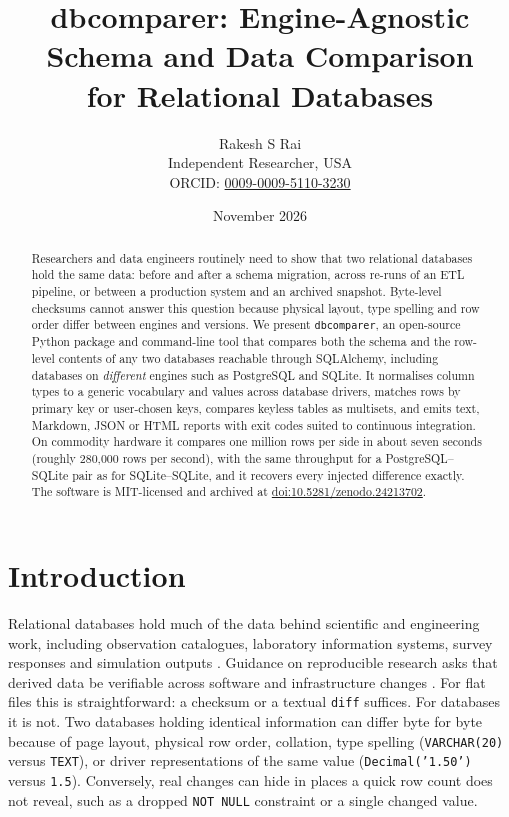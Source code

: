 \documentclass[11pt]{article}
\title{dbcomparer: Engine-Agnostic Schema and Data Comparison\\for Relational Databases}
\author{Rakesh S Rai\\[2pt]
  \small Independent Researcher, USA\\
  \small ORCID: \href{https://orcid.org/0009-0009-5110-3230}{0009-0009-5110-3230}}
\date{November 2026}
\begin{document}
\maketitle

\begin{abstract}
Researchers and data engineers routinely need to show that two relational
databases hold the same data: before and after a schema migration, across
re-runs of an ETL pipeline, or between a production system and an archived
snapshot. Byte-level checksums cannot answer this question because physical
layout, type spelling and row order differ between engines and versions.
We present \texttt{dbcomparer}, an open-source Python package and
command-line tool that compares both the schema and the row-level contents
of any two databases reachable through SQLAlchemy, including databases on
\emph{different} engines such as PostgreSQL and SQLite. It normalises column
types to a generic vocabulary and values across database drivers, matches
rows by primary key or user-chosen keys, compares keyless tables as
multisets, and emits text, Markdown, JSON or HTML reports with exit codes
suited to continuous integration. On commodity hardware it compares one
million rows per side in about seven seconds (roughly 280{,}000 rows per
second), with the same throughput for a PostgreSQL--SQLite pair as for
SQLite--SQLite, and it recovers every injected difference exactly. The
software is MIT-licensed and archived at
\href{https://doi.org/10.5281/zenodo.24213702}{doi:10.5281/zenodo.24213702}.
\end{abstract}

\section{Introduction}

Relational databases hold much of the data behind scientific and
engineering work, including observation catalogues, laboratory information
systems, survey responses and simulation outputs \citep{codd1970relational}.
Guidance on reproducible research asks that derived data be verifiable
across software and infrastructure changes
\citep{sandve2013ten,wilson2014best,wilkinson2016fair}. For flat files this is
straightforward: a checksum or a textual \texttt{diff} suffices. For
databases it is not. Two databases holding identical information can differ
byte for byte because of page layout, physical row order, collation, type
spelling (\texttt{VARCHAR(20)} versus \texttt{TEXT}), or driver
representations of the same value (\texttt{Decimal('1.50')} versus
\texttt{1.5}). Conversely, real changes can hide in places a quick row
count does not reveal, such as a dropped \texttt{NOT NULL} constraint or a
single changed value.
\end{document}

